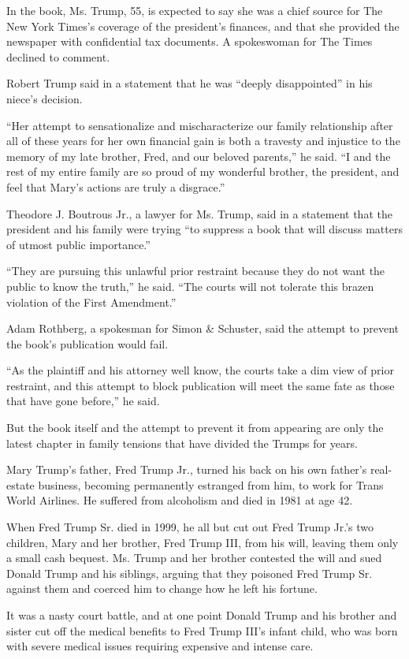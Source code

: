 In the book, Ms. Trump, 55, is expected to say she was a chief source
for The New York Times's coverage of the president's finances, and that
she provided the newspaper with confidential tax documents. A
spokeswoman for The Times declined to comment.

Robert Trump said in a statement that he was ``deeply disappointed'' in
his niece's decision.

``Her attempt to sensationalize and mischaracterize our family
relationship after all of these years for her own financial gain is both
a travesty and injustice to the memory of my late brother, Fred, and our
beloved parents,'' he said. ``I and the rest of my entire family are so
proud of my wonderful brother, the president, and feel that Mary's
actions are truly a disgrace.''

Theodore J. Boutrous Jr., a lawyer for Ms. Trump, said in a statement
that the president and his family were trying ``to suppress a book that
will discuss matters of utmost public importance.''

``They are pursuing this unlawful prior restraint because they do not
want the public to know the truth,'' he said. ``The courts will not
tolerate this brazen violation of the First Amendment.''

Adam Rothberg, a spokesman for Simon \& Schuster, said the attempt to
prevent the book's publication would fail.

``As the plaintiff and his attorney well know, the courts take a dim
view of prior restraint, and this attempt to block publication will meet
the same fate as those that have gone before,'' he said.

But the book itself and the attempt to prevent it from appearing are
only the latest chapter in family tensions that have divided the Trumps
for years.

Mary Trump's father, Fred Trump Jr., turned his back on his own father's
real-estate business, becoming permanently estranged from him, to work
for Trans World Airlines. He suffered from alcoholism and died in 1981
at age 42.

When Fred Trump Sr. died in 1999, he all but cut out Fred Trump Jr.'s
two children, Mary and her brother, Fred Trump III, from his will,
leaving them only a small cash bequest. Ms. Trump and her brother
contested the will and sued Donald Trump and his siblings, arguing that
they poisoned Fred Trump Sr. against them and coerced him to change how
he left his fortune.

It was a nasty court battle, and at one point Donald Trump and his
brother and sister cut off the medical benefits to Fred Trump III's
infant child, who was born with severe medical issues requiring
expensive and intense care.

